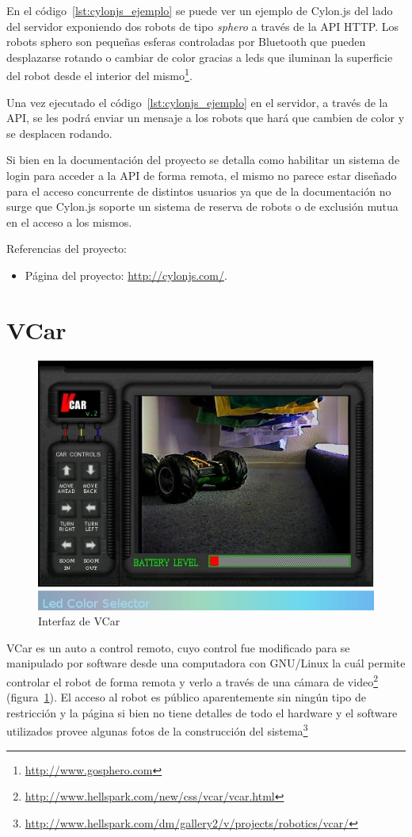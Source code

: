 En el código~\ref{lst:cylonjs_ejemplo} se puede ver un ejemplo de
Cylon.js del lado del servidor exponiendo dos robots de tipo
\textit{sphero} a través de la API HTTP. Los robots sphero son pequeñas
esferas controladas por Bluetooth que pueden desplazarse rotando o
cambiar de color gracias a
leds que iluminan la superficie del robot desde el interior del
mismo\footnote{\url{http://www.gosphero.com}}.

Una vez ejecutado el código~\ref{lst:cylonjs_ejemplo} en el servidor,
a través de la API, se
les podrá enviar un mensaje a los robots que hará que cambien
de color
y se desplacen
rodando.

Si bien en la documentación del proyecto se detalla como habilitar
un sistema de login para acceder a la API de forma remota, el mismo
no parece estar diseñado para el acceso concurrente de distintos usuarios
ya que de la documentación no surge que Cylon.js soporte un sistema
de reserva de robots o de exclusión mutua en el acceso a los mismos.

Referencias del proyecto:
\begin{itemize}
    \item Página del proyecto: \url{http://cylonjs.com/}.
\end{itemize}


\section{VCar}

\begin{figure}
    \centering
    \includegraphics[width=0.5\linewidth]{figures/vcar}
    \caption{Interfaz de VCar}
    \label{fig:vcar}
\end{figure}

VCar es un auto a control remoto, cuyo control fue modificado para
se manipulado por software desde  una computadora con GNU/Linux la
cuál permite controlar el robot de forma remota y verlo
a través de una cámara de
video\footnote{\url{http://www.hellspark.com/new/css/vcar/vcar.html}}
(figura~\ref{fig:vcar}).
El acceso al robot es público
aparentemente sin ningún tipo de restricción y la página
si bien no tiene detalles de todo el hardware y el software utilizados
provee algunas fotos de la construcción del
sistema\footnote{\url{http://www.hellspark.com/dm/gallery2/v/projects/robotics/vcar/}}

